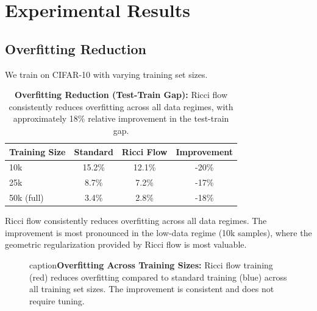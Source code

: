 \documentclass[12pt,a4paper]{article}
\begin{document}
\section{Experimental Results}

\subsection{Overfitting Reduction}

We train on CIFAR-10 with varying training set sizes.

\begin{table}[htbp]
\centering
\begin{tabular}{@{}lccc@{}}
\toprule
\textbf{Training Size} & \textbf{Standard} & \textbf{Ricci Flow} & \textbf{Improvement} \\
\midrule
10k & 15.2\% & 12.1\% & -20\% \\
25k & 8.7\% & 7.2\% & -17\% \\
50k (full) & 3.4\% & 2.8\% & -18\% \\
\bottomrule
\end{tabular}
\caption{\textbf{Overfitting Reduction (Test-Train Gap):} Ricci flow 
         consistently reduces overfitting across all data regimes, 
         with approximately 18\% relative improvement in the test-train gap.}
\label{tab:overfitting}
\end{table}

Ricci flow consistently reduces overfitting across all data regimes. The improvement is most pronounced in the low-data regime (10k samples), where the geometric regularization provided by Ricci flow is most valuable.

\begin{figure}[htbp]
\centering
{}
caption{\textbf{Overfitting Across Training Sizes:} Ricci flow training 
         (red) reduces overfitting compared to standard training (blue) 
         across all training set sizes. The improvement is consistent 
         and does not require tuning.}
\label{fig:overfitting_plot}
\end{figure}
\end{document}
